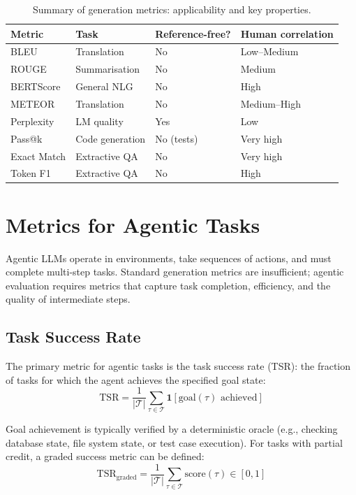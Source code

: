 \begin{table}[ht!]
\centering
\caption{Summary of generation metrics: applicability and key properties.}
\begin{tabular}{@{}lp{3.5cm}p{3.5cm}p{6cm}@{}}
\toprule
\textbf{Metric} & \textbf{Task} & \textbf{Reference-free?} & \textbf{Human correlation} \\
\midrule
BLEU & Translation & No & Low--Medium \\
ROUGE & Summarisation & No & Medium \\
BERTScore & General NLG & No & High \\
METEOR & Translation & No & Medium--High \\
Perplexity & LM quality & Yes & Low \\
Pass@k & Code generation & No (tests) & Very high \\
Exact Match & Extractive QA & No & Very high \\
Token F1 & Extractive QA & No & High \\
\bottomrule
\end{tabular}
\end{table}

\section{Metrics for Agentic Tasks}
\label{subsec:agentic-metrics}

Agentic LLMs operate in environments, take sequences of actions, and must complete multi-step tasks. Standard generation metrics are insufficient; agentic evaluation requires metrics that capture task completion, efficiency, and the quality of intermediate steps.

\subsection{Task Success Rate}
\label{task-success-rate}

The primary metric for agentic tasks is the task success rate (TSR): the fraction of tasks for which the agent achieves the specified goal state: 
\begin{equation}
    \text{TSR} = \frac{1}{|\mathcal{T}|} \sum_{\tau \in \mathcal{T}} \mathbf{1}[\text{goal}(\tau) \text{ achieved}]
\end{equation}

Goal achievement is typically verified by a deterministic oracle (e.g., checking database state, file system state, or test case execution). For tasks with partial credit, a graded success metric can be defined: 
\begin{equation}
    \text{TSR}_{\text{graded}} = \frac{1}{|\mathcal{T}|} \sum_{\tau \in \mathcal{T}} \text{score}(\tau) \in [0, 1]
\end{equation}

